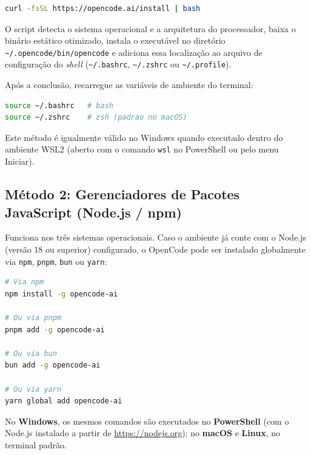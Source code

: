 \begin{lstlisting}[language=bash, caption={Instala{\c c}{\~a}o r{\'a}pida via cURL}]
curl -fsSL https://opencode.ai/install | bash
\end{lstlisting}

O script detecta o sistema operacional e a arquitetura do processador, baixa o bin{\'a}rio est{\'a}tico otimizado, instala o execut{\'a}vel no diret{\'o}rio \texttt{\textasciitilde/.opencode/bin/opencode} e adiciona essa localiza{\c c}{\~a}o ao arquivo de configura{\c c}{\~a}o do \emph{shell} (\texttt{\textasciitilde/.bashrc}, \texttt{\textasciitilde/.zshrc} ou \texttt{\textasciitilde/.profile}).

Ap{\'o}s a conclus{\~a}o, recarregue as vari{\'a}veis de ambiente do terminal:
\begin{lstlisting}[language=bash, caption={Recarga do shell (Linux/macOS/WSL2)}]
source ~/.bashrc   # bash
source ~/.zshrc    # zsh (padrao no macOS)
\end{lstlisting}

Este m{\'e}todo {\'e} igualmente v{\'a}lido no Windows quando executado dentro do ambiente WSL2 (aberto com o comando \texttt{wsl} no PowerShell ou pelo menu Iniciar).

\subsection{M{\'e}todo 2: Gerenciadores de Pacotes JavaScript (Node.js / npm)}

Funciona nos tr{\^e}s sistemas operacionais. Caso o ambiente j{\'a} conte com o Node.js (vers{\~a}o 18 ou superior) configurado, o OpenCode pode ser instalado globalmente via \texttt{npm}, \texttt{pnpm}, \texttt{bun} ou \texttt{yarn}:

\begin{lstlisting}[language=bash, caption={Instala{\c c}{\~a}o global via npm, pnpm, bun ou yarn}]
# Via npm
npm install -g opencode-ai

# Ou via pnpm
pnpm add -g opencode-ai

# Ou via bun
bun add -g opencode-ai

# Ou via yarn
yarn global add opencode-ai
\end{lstlisting}

No \textbf{Windows}, os mesmos comandos s{\~a}o executados no \textbf{PowerShell} (com o Node.js instalado a partir de \url{https://nodejs.org}); no \textbf{macOS} e \textbf{Linux}, no terminal padr{\~a}o.

